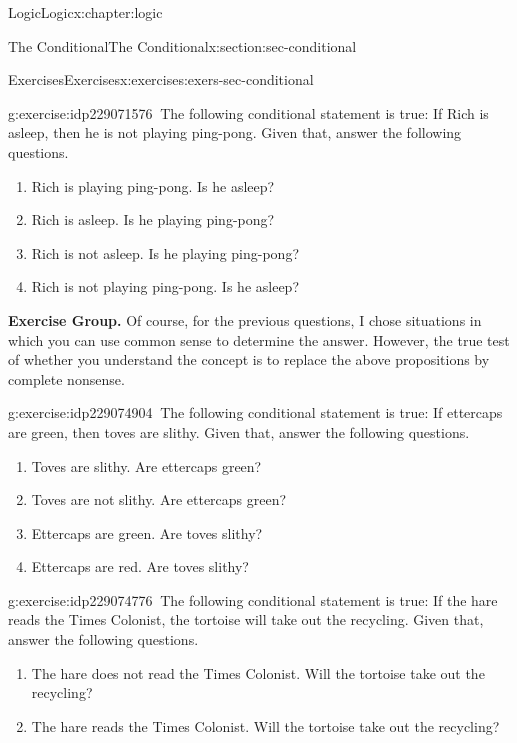 \documentclass[twoside,10pt,]{book}
\numberwithin{equation}{section}
\begin{document}
\begin{chapterptx}{Logic}{}{Logic}{}{}{x:chapter:logic}
\begin{sectionptx}{The Conditional}{}{The Conditional}{}{}{x:section:sec-conditional}
\begin{exercises-subsection}{Exercises}{}{Exercises}{}{}{x:exercises:exers-sec-conditional}
\begin{divisionexercise}{20}{}{}{g:exercise:idp229071576}%
\(\ \)The following conditional statement is true: If Rich is asleep, then he is not playing ping-pong.  Given that, answer the following questions. %
\begin{enumerate}[label=(\alph*)]
\item{}Rich is playing ping-pong.  Is he asleep?%
\item{}Rich is asleep.  Is he playing ping-pong?%
\item{}Rich is not asleep.  Is he playing ping-pong?%
\item{}Rich is not playing ping-pong.  Is he asleep?%
\end{enumerate}
\end{divisionexercise}%
\par\medskip\noindent%
\textbf{Exercise Group.}\space\space%
Of course, for the previous questions, I chose situations in which you can use common sense to determine the answer.  However, the true test of whether you understand the concept is to replace the above propositions by complete nonsense.\begin{exercisegroup}
\begin{divisionexerciseeg}{21}{}{}{g:exercise:idp229074904}%
\(\ \)The following conditional statement is true: If ettercaps are green, then toves are slithy.  Given that, answer the following questions. %
\begin{enumerate}[label=(\alph*)]
\item{}Toves are slithy.  Are ettercaps green?%
\item{}Toves are not slithy.  Are ettercaps green?%
\item{}Ettercaps are green.  Are toves slithy?%
\item{}Ettercaps are red.  Are toves slithy?%
\end{enumerate}
\end{divisionexerciseeg}%
\begin{divisionexerciseeg}{22}{}{}{g:exercise:idp229074776}%
\(\ \)The following conditional statement is true: If the hare reads the Times Colonist, the tortoise will take out the recycling.  Given that, answer the following questions. %
\begin{enumerate}[label=(\alph*)]
\item{}The hare does not read the Times Colonist.  Will the tortoise take out the recycling?%
\item{}The hare reads the Times Colonist.  Will the tortoise take out the recycling?%

\end{enumerate}
\end{divisionexerciseeg}
\end{exercisegroup}
\end{exercises-subsection}
\end{sectionptx}
\end{chapterptx}
\end{document}
